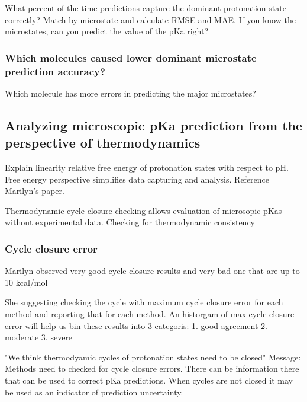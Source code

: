 \documentclass[9pt,lineno,final]{elife}
\begin{document}
What percent of the time predictions capture the dominant protonation state correctly? 
Match by microstate and calculate RMSE and MAE. If you know the microstates, can you predict the value of the pKa right? 




\subsubsection{Which molecules caused lower dominant microstate prediction accuracy?}

Which molecule has more errors in predicting the major microstates?









\subsection{Analyzing microscopic pKa prediction from the perspective of thermodynamics}
Explain  linearity  relative free energy of protonation states with respect to pH. Free energy perspective simplifies data capturing and analysis. Reference Marilyn's paper.

Thermodynamic cycle closure checking allows evaluation of microsopic pKas  without experimental data.
Checking for thermodynamic consistency


\subsubsection{Cycle closure error}

Marilyn observed very good cycle closure results and very bad one that are up to 10 kcal/mol
 
She suggesting checking the cycle with maximum cycle closure error for each method and reporting that for each method.
An historgam of max cycle closure error will help us bin these results into 3 categoris:
1. good agreement
2. moderate
3. severe 
 
"We think thermodyamic cycles of protonation states need to be closed"
Message: Methods need to checked for cycle closure errors.
There can be information there that can be used to correct pKa predictions.
When cycles are not closed it may be used as an indicator of prediction uncertainty.
\end{document}
